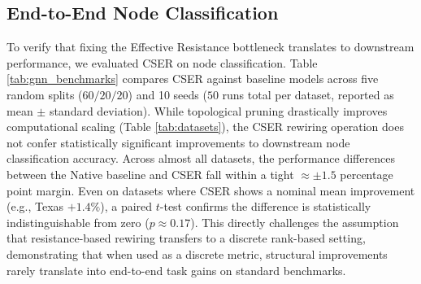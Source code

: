 \documentclass[10pt]{article} %
\begin{document}
\subsection{End-to-End Node Classification}
To verify that fixing the Effective Resistance bottleneck translates to downstream performance, we evaluated CSER on node classification. Table \ref{tab:gnn_benchmarks} compares CSER against baseline models across five random splits ($60/20/20$) and 10 seeds ($50$ runs total per dataset, reported as mean $\pm$ standard deviation). While topological pruning drastically improves computational scaling (Table \ref{tab:datasets}), the CSER rewiring operation does not confer statistically significant improvements to downstream node classification accuracy. Across almost all datasets, the performance differences between the Native baseline and CSER fall within a tight $\approx \pm 1.5$ percentage point margin. Even on datasets where CSER shows a nominal mean improvement (e.g., Texas $+1.4\%$), a paired $t$-test confirms the difference is statistically indistinguishable from zero ($p \approx 0.17$). This directly challenges the assumption that resistance-based rewiring transfers to a discrete rank-based setting, demonstrating that when used as a discrete metric, structural improvements rarely translate into end-to-end task gains on standard benchmarks.
\end{document}
